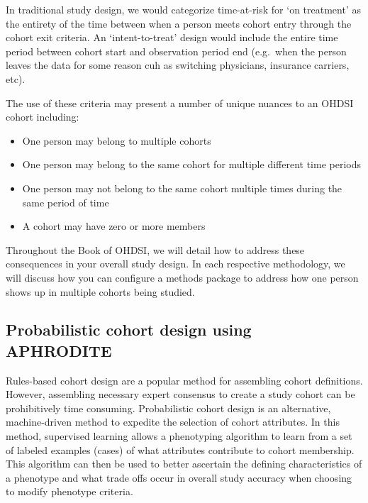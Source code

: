\documentclass[11pt]{book}
\providecommand{\tightlist}{%
  \setlength{\itemsep}{0pt}\setlength{\parskip}{0pt}}
\theoremstyle{definition}
\theoremstyle{definition}
\theoremstyle{definition}
\theoremstyle{remark}
\begin{document}
In traditional study design, we would categorize time-at-risk for `on treatment' as the entirety of the time between when a person meets cohort entry through the cohort exit criteria. An `intent-to-treat' design would include the entire time period between cohort start and observation period end (e.g.~when the person leaves the data for some reason cuh as switching physicians, insurance carriers, etc).

The use of these criteria may present a number of unique nuances to an OHDSI cohort including:

\begin{itemize}
\tightlist
\item
  One person may belong to multiple cohorts
\item
  One person may belong to the same cohort for multiple different time periods
\item
  One person may not belong to the same cohort multiple times during the same period of time
\item
  A cohort may have zero or more members
\end{itemize}

Throughout the Book of OHDSI, we will detail how to address these consequences in your overall study design. In each respective methodology, we will discuss how you can configure a methods package to address how one person shows up in multiple cohorts being studied.

\hypertarget{probabilistic-cohort-design-using-aphrodite}{%
\subsection{Probabilistic cohort design using APHRODITE}\label{probabilistic-cohort-design-using-aphrodite}}

Rules-based cohort design are a popular method for assembling cohort definitions. However, assembling necessary expert consensus to create a study cohort can be prohibitively time consuming. Probabilistic cohort design is an alternative, machine-driven method to expedite the selection of cohort attributes. In this method, supervised learning allows a phenotyping algorithm to learn from a set of labeled examples (cases) of what attributes contribute to cohort membership. This algorithm can then be used to better ascertain the defining characteristics of a phenotype and what trade offs occur in overall study accuracy when choosing to modify phenotype criteria.
\end{document}
